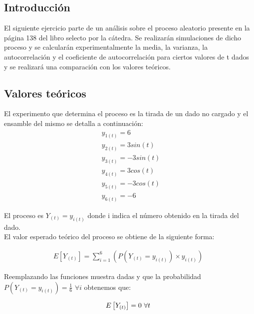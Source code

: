 %
%
\subsection{Introducción}

El siguiente ejercicio parte de un análisis sobre el proceso aleatorio presente en la página 138 del libro selecto por la cátedra. Se realizarán simulaciones de dicho proceso y se calcularán experimentalmente la media, la varianza, la autocorrelación y el coeficiente de autocorrelación para ciertos valores de t dados y se realizará una comparación con los valores teóricos.

\subsection{Valores teóricos}

El experimento que determina el proceso es la tirada de un dado no cargado y el ensamble del mismo se detalla a continuación:
\begin{equation} 
	\begin{split}
		 &y_{1(t)} = 6 \\
		 &y_{2(t)} = 3sin(t) \\
		 &y_{3(t)} = -3sin(t) \\
		 &y_{4(t)} = 3cos(t) \\
		 &y_{5(t)} = -3cos(t) \\
		 &y_{6(t)} = -6
	\end{split}
\end{equation}

El proceso es $Y_{(t)} = y_{i(t)}$ donde i indica el número obtenido en la tirada del dado.\\

El valor esperado teórico del proceso se obtiene de la siguiente forma:

\begin{equation*}
\begin{gathered}
	E\left[Y_{(t)}\right] = \sum_{i=1}^{6}\left( P(Y_{(t)} = y_{i(t)}) \times y_{i(t)}\right) 
\end{gathered}
\end{equation*}

Reemplazando las funciones muestra dadas y que la probabilidad $P(Y_{(t)} = y_{i(t)})= \frac{1}{6}$ $ \forall i $ obtenemos que:	

\begin{equation*}
\begin{gathered}
	E\left[Y_{(t)}\right] = 0$ $\forall t 
\end{gathered}
\end{equation*}

